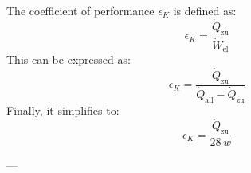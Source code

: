 The coefficient of performance \( \epsilon_K \) is defined as:  
\[
\epsilon_K = \frac{\dot{Q}_{\text{zu}}}{\dot{W}_{\text{el}}}
\]  
This can be expressed as:  
\[
\epsilon_K = \frac{\dot{Q}_{\text{zu}}}{\dot{Q}_{\text{all}} - \dot{Q}_{\text{zu}}}
\]  
Finally, it simplifies to:  
\[
\epsilon_K = \frac{\dot{Q}_{\text{zu}}}{28 \, w}
\]  

---